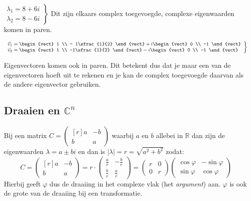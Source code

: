 $\left.\begin{array}{l}
	\lambda_1 = 8+6i \\
	\lambda_2 = 8-6i
\end{array}\right\}$ Dit zijn elkaars complex toegevoegde, complexe eigenwaarden komen in paren.

$\left.\begin{array}{l}
	\vec{v}_1 = \begin{vect} 1 \\ - 1\sfrac{1}{2} \end{vect} + i \begin{vect} 0 \\ -1 \end{vect} \\
	\vec{v}_2 = \begin{vect} 1 \\ -1\sfrac{1}{2} \end{vect} - i \begin{vect} 0 \\ -1 \end{vect}
\end{array}\right\}$

Eigenvectoren komen ook in paren. Dit betekent dus dat je maar een van de eigenvectoren hoeft uit te rekenen en je kan de complex toegevoegde daarvan als de andere eigenvector gebruiken.

\subsection{Draaien en $\mathbb{C}^n$}
Bij een matrix $C = \begin{pmatrix*}[r] a & -b \\ b & a \end{pmatrix*}$ waarbij $a$ en $b$ allebei in $\mathbb{R}$ dan zijn de eigenwaarden $\lambda = a \pm bi$ en dan is $|\lambda| = r = \sqrt{a^2 + b^2}$ zodat:
\[ C = \begin{pmatrix*}[r] a & -b \\ b & a \end{pmatrix*} = r \cdot \begin{pmatrix}
	\frac{a}{r} & -\frac{b}{r} \\
	\frac{b}{r} & \frac{a}{r}
\end{pmatrix} = \begin{pmatrix} r & 0 \\ 0 & r \end{pmatrix} \begin{pmatrix}
	\cos \varphi & -\sin \varphi \\
	\sin \varphi & \cos \varphi
\end{pmatrix} \]
Hierbij geeft $\varphi$ dus de draaiing in het complexe vlak (het \emph{argument}) aan. $\varphi$ is ook de grote van de draaiing bij een transformatie.

